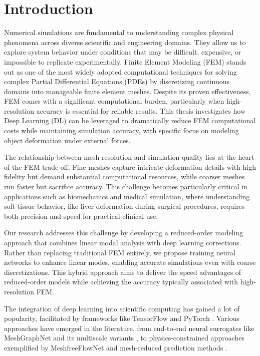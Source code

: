 

\section{Introduction}
Numerical simulations are fundamental to understanding complex physical phenomena across diverse scientific and engineering domains. They allow us to explore system behavior under conditions that may be difficult, expensive, or impossible to replicate experimentally. Finite Element Modeling (FEM) stands out as one of the most widely adopted computational techniques for solving complex Partial Differential Equations (PDEs) by discretizing continuous domains into manageable finite element meshes. Despite its proven effectiveness, FEM comes with a significant computational burden, particularly when high-resolution accuracy is essential for reliable results. This thesis investigates how Deep Learning (DL) can be leveraged to dramatically reduce FEM computational costs while maintaining simulation accuracy, with specific focus on modeling object deformation under external forces.

The relationship between mesh resolution and simulation quality lies at the heart of the FEM trade-off. Fine meshes capture intricate deformation details with high fidelity but demand substantial computational resources, while coarser meshes run faster but sacrifice accuracy. This challenge becomes particularly critical in applications such as biomechanics and medical simulation, where understanding soft tissue behavior, like liver deformation during surgical procedures, requires both precision and speed for practical clinical use.

Our research addresses this challenge by developing a reduced-order modeling approach that combines linear modal analysis with deep learning corrections. Rather than replacing traditional FEM entirely, we propose training neural networks to enhance linear modes, enabling accurate simulations even with coarse discretizations. This hybrid approach aims to deliver the speed advantages of reduced-order models while achieving the accuracy typically associated with high-resolution FEM.

The integration of deep learning into scientific computing has gained a lot of popularity, facilitated by frameworks like TensorFlow \cite{tensorflow2015-whitepaper} and PyTorch \cite{paszke2019pytorchimperativestylehighperformance}. Various approaches have emerged in the literature, from end-to-end neural surrogates like MeshGraphNet \cite{pfaffLearningMeshBasedSimulation2021a} and its multiscale variants \cite{fortunatoMultiScaleMeshGraphNets2022}, to physics-constrained approaches exemplified by MeshfreeFlowNet \cite{jiangMeshfreeFlowNetPhysicsConstrainedDeep2020} and mesh-reduced prediction methods \cite{hanPredictingPhysicsMeshreduced2022a}.

